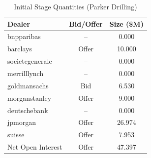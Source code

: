 \begin{table}[htbp]
\centering
\caption{Initial Stage Quantities (Parker Drilling)}
\label{tab:quantities}
\begin{tabular}{lcc}
\hline\hline
Dealer & Bid/Offer & Size (\$M) \\
\hline
bnpparibas & -- & 0.000 \\
barclays & Offer & 10.000 \\
societegenerale & -- & 0.000 \\
merrilllynch & -- & 0.000 \\
goldmansachs & Bid & 6.530 \\
morganstanley & Offer & 9.000 \\
deutschebank & -- & 0.000 \\
jpmorgan & Offer & 26.974 \\
suisse & Offer & 7.953 \\
\hline
Net Open Interest & Offer & 47.397 \\
\hline\hline
\end{tabular}
\end{table}
